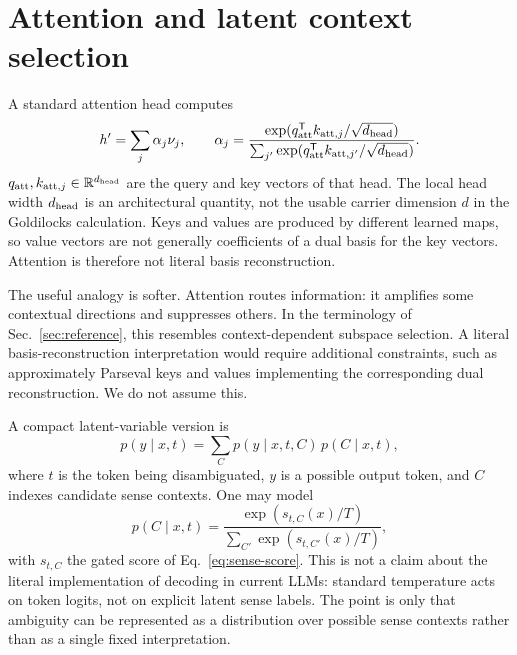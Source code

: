 \documentclass[
  aps,
  reprint,
  superscriptaddress,
  floatfix,
  nofootinbib,
  longbibliography
]{revtex4-2}
\newcommand{\R}{\mathbb{R}}
\newcommand{\T}{^{\mathsf{T}}}
\begin{document}
\section{Attention and latent context selection}
\label{sec:attention}

A standard attention head computes
%
\begin{equation}
\label{eq:attention}
h'=\sum_j\alpha_j\nu_j,
\qquad
\alpha_j=
\frac{\exp(q_{\rm att}\T k_{{\rm att},j}/\sqrt{d_{\rm head}})}
{\sum_{j'}\exp(q_{\rm att}\T k_{{\rm att},j'}/\sqrt{d_{\rm head}})} .
\end{equation}
%
$q_{\rm att},k_{{\rm att},j}\in\R^{d_{\rm head}}$ are the query and key
vectors of that head.  The local head width $d_{\rm head}$ is an architectural
quantity, not the usable carrier dimension $d$ in the Goldilocks calculation.
Keys and values are produced by different learned maps, so value vectors
are not generally coefficients of a dual basis for the key vectors.
Attention is therefore not literal basis reconstruction.

The useful analogy is softer. Attention routes information: it amplifies
some contextual directions and suppresses others. In the terminology of
Sec.~\ref{sec:reference}, this resembles context-dependent subspace
selection. A literal basis-reconstruction interpretation would require
additional constraints, such as approximately Parseval keys and values
implementing the corresponding dual reconstruction. We do not assume this.

A compact latent-variable version is
%
\begin{equation}
\label{eq:latent}
p(y\mid x,t)=\sum_C p(y\mid x,t,C)\,p(C\mid x,t),
\end{equation}
%
where $t$ is the token being disambiguated, $y$ is a possible output token,
and $C$ indexes candidate sense contexts. One may model
%
\begin{equation}
\label{eq:context-temp}
p(C\mid x,t)=
\frac{\exp(s_{t,C}(x)/T)}
{\sum_{C'}\exp(s_{t,C'}(x)/T)} ,
\end{equation}
%
with $s_{t,C}$ the gated score of Eq.~\eqref{eq:sense-score}. This is not
a claim about the literal implementation of decoding in current LLMs:
standard temperature acts on token logits, not on explicit latent
sense labels. The point is only that ambiguity can be represented as a
distribution over possible sense contexts rather than as a single fixed
interpretation.
\end{document}

